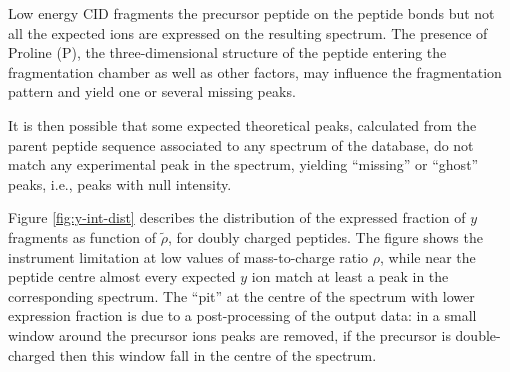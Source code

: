 Low energy CID fragments the precursor peptide on the peptide bonds but not all
the expected ions are expressed on the resulting spectrum. The presence of
Proline (P), the three-dimensional structure of the
peptide entering the fragmentation chamber as well as other factors, may influence the
fragmentation pattern and yield one or several missing peaks.

It is  then possible that some expected theoretical peaks, calculated from the
parent peptide sequence associated to any spectrum of the database, 
do not match any  experimental peak in the
spectrum, yielding ``missing'' or ``ghost'' peaks, i.e., 
peaks with null intensity.


Figure \ref{fig:y-int-dist} describes the distribution of the expressed fraction
of $y$ fragments as function of $\tilde\rho$, for doubly charged peptides.
The figure shows the instrument limitation at low values of mass-to-charge
ratio $\rho$, while near the peptide centre almost every expected $y$ ion
match at least a peak in the corresponding spectrum.
The ``pit'' at the centre of the spectrum with lower expression fraction  
is due to a post-processing of the output data: in a small window around the
precursor ions peaks are removed, if the precursor is double-charged then this
window fall in the centre of the spectrum.

